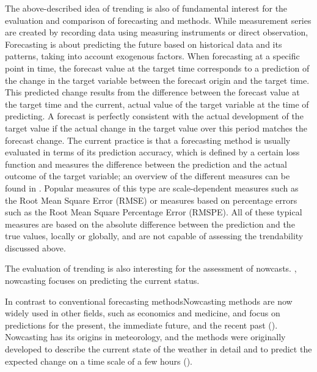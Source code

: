 The above-described idea of trending is also of fundamental interest for the evaluation and comparison of forecasting and methods. 
While measurement series are created by recording data using measuring instruments or direct observation, Forecasting is about predicting the future based on historical data and its patterns, taking into account exogenous factors. 
When forecasting at a specific point in time, the forecast value at the target time corresponds to a prediction of the change in the target variable between the forecast origin and the target time. 
This predicted change results from the difference between the forecast value at the target time and the current, actual value of the target variable at the time of predicting. 
A forecast is perfectly consistent with the actual development of the target value if the actual change in the target value over this period matches the forecast change. 
The current practice is that a forecasting method is usually evaluated in terms of its prediction accuracy, which is defined by a certain loss function and measures the difference between the prediction and the actual outcome of the target variable; an overview of the different measures can be found in \cite{hyndman2006another}. 
Popular measures of this type are scale-dependent measures such as the Root Mean Square Error (RMSE) or measures based on percentage errors such as the Root Mean Square Percentage Error (RMSPE). 
All of these typical measures are based on the absolute difference between the prediction and the true values, locally or globally, and are not capable of assessing the trendability discussed above.

The evaluation of trending is also interesting for the assessment of nowcasts.
, nowcasting focuses on predicting the current status.

In contrast to conventional forecasting methodsNowcasting methods are now widely used in other fields, such as economics and medicine, and focus on predictions for the present, the immediate future, and the recent past (\cite{banbura2013now, bok2018macroeconomic, wolffram2023collaborative}).
Nowcasting has its origins in meteorology, and the methods were originally developed to describe the current state of the weather in detail and to predict the expected change on a time scale of a few hours (\cite{browning1989nowcasting,schmid2019nowcasting}).


